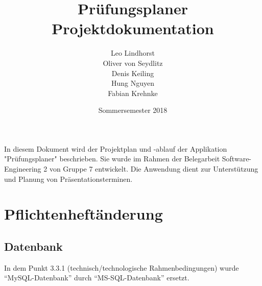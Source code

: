 \documentclass{scrartcl}
\begin{document}
	\title{Prüfungsplaner \\ Projektdokumentation}
	\author{Leo Lindhorst\\
			Oliver von Seydlitz\\
			Denis Keiling\\
			Hung Nguyen\\
			Fabian Krehnke}
	\date{Sommersemester 2018}
	\maketitle

	In diesem Dokument wird der Projektplan und -ablauf der Applikation "Prüfungsplaner" beschrieben. Sie wurde im Rahmen der Belegarbeit Software-Engineering 2 von Gruppe 7 entwickelt. Die Anwendung dient zur Unterstützung und Planung von Präsentationsterminen.

	\tableofcontents
	\newpage

	
  
	
  

  \section{Pflichtenheftänderung}
  \subsection{Datenbank}
  In dem Punkt 3.3.1 (technisch/technologische Rahmenbedingungen) wurde “MySQL-Datenbank” durch “MS-SQL-Datenbank” ersetzt.

	
\end{document}
